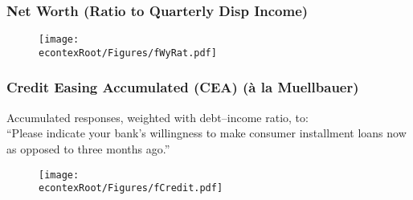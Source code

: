 \documentclass[pdflatex]{beamer}
\newcommand{\jemph}[1]{{\color{jirkasred}#1}}
\begin{document}
                                           \begin{frame}
                                             \frametitle{\textbf{Net Worth (Ratio to Quarterly Disp Income)}}

                                             \begin{figure}
                                               \texttt{[image: \\econtexRoot/Figures/fWyRat.pdf]}
                                             \end{figure}

                                           \end{frame}

                                           \begin{frame}
                                             \frametitle{\textbf{Credit Easing Accumulated (CEA) (\`a la Muellbauer)}}
                                             Accumulated responses, weighted with debt--income ratio, to: \\
                                             \footnotesize{``Please indicate your \jemph{bank's willingness to make consumer installment loans} now as opposed to three months ago.''}

                                             \begin{figure}
                                               \texttt{[image: \\econtexRoot/Figures/fCredit.pdf]}
                                             \end{figure}

                                           \end{frame}
\end{document}
